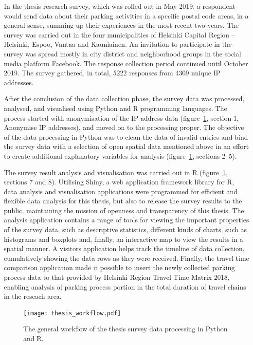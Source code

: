 In the thesis research survey, which was rolled out in May 2019, a respondent would send data about their parking activities in a specific postal code areas, in a general sense, summing up their experiences in the most recent two years. The survey was carried out in the four municipalities of Helsinki Capital Region -- Helsinki, Espoo, Vantaa and Kauniainen. An invitation to participate in the survey was spread mostly in city district and neighborhood groups in the social media platform Facebook. The response collection period continued until October 2019. The survey gathered, in total, 5222 responses from 4309 unique IP addresses.

After the conclusion of the data collection phase, the survey data was processed, analysed, and visualised using Python and R programming languages. The process started with anonymisation of the IP address data (figure~\ref{fig:gen_workflow}, section 1, Anonymise IP addresses), and moved on to the processing proper. The objective of the data processing in Python was to clean the data of invalid entries and bind the survey data with a selection of open spatial data mentioned above in an effort to create additional explanatory variables for analysis (figure~\ref{fig:gen_workflow}, sections 2--5).

The survey result analysis and visualisation was carried out in R (figure~\ref{fig:gen_workflow}, sections 7 and 8). Utilising Shiny, a web application framework library for R, data analysis and visualisation applications were programmed for efficient and flexible data analysis for this thesis, but also to release the survey results to the public, maintaining the mission of openness and transparency of this thesis. The analysis application contains a range of tools for viewing the important properties of the survey data, such as descriptive statistics, different kinds of charts, such as histograms and boxplots and, finally, an interactive map to view the results in a spatial manner. A visitors application helps track the timeline of data collection, cumulatively showing the data rows as they were received. Finally, the travel time comparison application made it possible to insert the newly collected parking process data to that provided by Helsinki Region Travel Time Matrix 2018, enabling analysis of parking process portion in the total duration of travel chains in the reseach area.

\begin{figure}[H]
    \centering
    \texttt{[image: thesis\_workflow.pdf]}
    \caption{The general workflow of the thesis survey data processing in Python and R.}
    \label{fig:gen_workflow}
\end{figure}
\pagebreak

